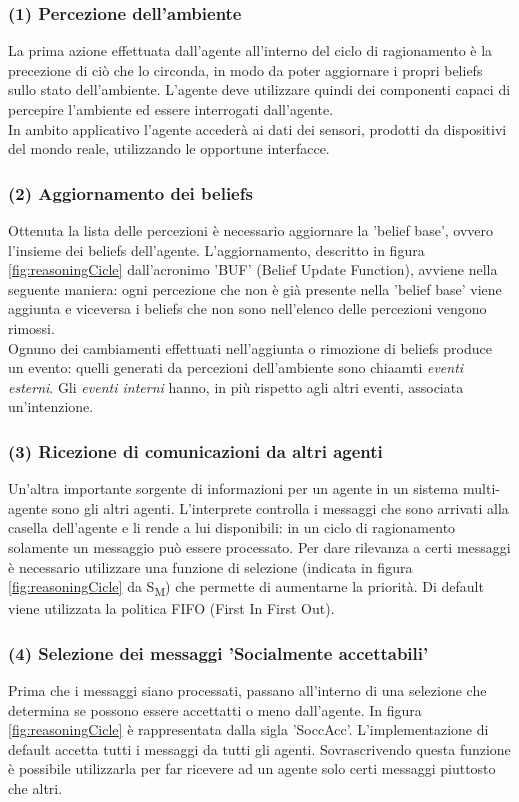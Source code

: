 \documentclass[12pt,a4paper,openright,twoside]{report}
\begin{document}
\subsubsection{(1) Percezione dell'ambiente}
La prima azione effettuata dall'agente all'interno del ciclo di ragionamento \`e la precezione di ci\`o che lo circonda, in modo da poter aggiornare i propri beliefs sullo stato dell'ambiente. L'agente deve utilizzare quindi dei componenti capaci di percepire l'ambiente ed essere interrogati dall'agente.
\\
In ambito applicativo l'agente acceder\`a ai dati dei sensori, prodotti da dispositivi del mondo reale, utilizzando le opportune interfacce.


\subsubsection{(2) Aggiornamento dei beliefs}
Ottenuta la lista delle percezioni \`e necessario aggiornare la 'belief base', ovvero l'insieme dei beliefs dell'agente. L'aggiornamento, descritto in figura \ref{fig:reasoningCicle} dall'acronimo 'BUF' (Belief Update Function), avviene nella seguente maniera: ogni percezione che non \`e gi\`a presente nella 'belief base' viene aggiunta e viceversa i beliefs che non sono nell'elenco delle percezioni vengono rimossi.
\\
Ognuno dei cambiamenti effettuati nell'aggiunta o rimozione di beliefs produce un evento: quelli generati da percezioni dell'ambiente sono chiaamti \textit{eventi esterni}. Gli \textit{eventi interni} hanno, in pi\`u rispetto agli altri eventi, associata un'intenzione.


\subsubsection{(3) Ricezione di comunicazioni da altri agenti}
Un'altra importante sorgente di informazioni per un agente in un sistema multi-agente sono gli altri agenti. L'interprete controlla i messaggi che sono arrivati alla casella dell'agente e li rende a lui disponibili: in un ciclo di ragionamento solamente un messaggio pu\`o essere processato. Per dare rilevanza a certi messaggi \`e necessario utilizzare una funzione di selezione (indicata in figura \ref{fig:reasoningCicle} da S\textsubscript{M}) che permette di aumentarne la priorit\`a. Di default viene utilizzata la politica FIFO (First In First Out).


\subsubsection{(4) Selezione dei messaggi 'Socialmente accettabili'}
Prima che i messaggi siano processati, passano all'interno di una selezione che determina se possono essere accettatti o meno dall'agente. In figura \ref{fig:reasoningCicle} \`e rappresentata dalla sigla 'SoccAcc'. L'implementazione di default accetta tutti i messaggi da tutti gli agenti. Sovrascrivendo questa funzione \`e possibile utilizzarla per far ricevere ad un agente solo certi messaggi piuttosto che altri.
\end{document}
